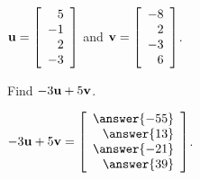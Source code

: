 \documentclass{ximera}
\author{Zack Reed}
\begin{document}
  
\begin{problem}
  $\vect{u}=\startmat{r}
    5 \\
    -1 \\
    2 \\
    -3
  \stopmat$ and 
  $\vect{v}=\startmat{r}
    -8 \\
    2 \\
    -3 \\
    6
  \stopmat$.
  
  Find $-3\vect{u} + 5\vect{v}$.
  
  $-3\vect{u} + 5\vect{v}=\startmat{r}
    \answer{-55} \\
    \answer{13} \\
    \answer{-21} \\
    \answer{39}
  \stopmat$.
  
\end{problem}
\end{document}
